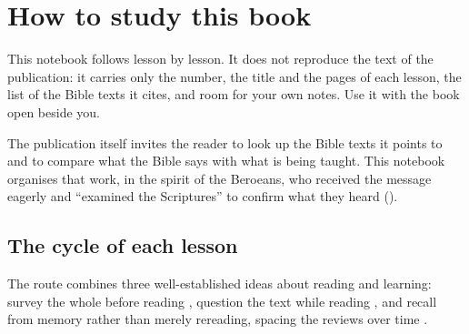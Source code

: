 \chapter{How to study this book}

This notebook follows \emph{\livroNome} \parencite{livro} lesson by lesson. It
does not reproduce the text of the publication: it carries only the number,
the title and the pages of each lesson, the list of the Bible texts it cites,
and room for your own notes. Use it with the book open beside you.

The publication itself invites the reader to look up the Bible texts it points
to and to compare what the Bible says with what is being taught. This notebook
organises that work, in the spirit of the Beroeans, who received the message
eagerly and \enquote{examined the Scriptures} to confirm what they heard
().

\section{The cycle of each lesson}

The route combines three well-established ideas about reading and learning:
survey the whole before reading \parencite{robinson1946}, question the text
while reading \parencite{adler1972}, and recall from memory rather than merely
rereading, spacing the reviews over time \parencite{brown2014}.

\begin{center}
\end{center}

